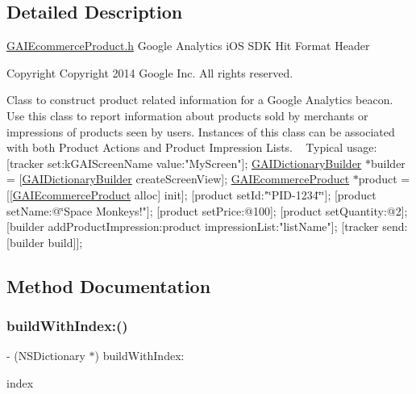 \subsection{Detailed Description}
\hyperlink{_g_a_i_ecommerce_product_8h}{G\+A\+I\+Ecommerce\+Product.\+h}  Google Analytics i\+OS S\+DK Hit Format Header \begin{DoxyCopyright}{Copyright}
Copyright 2014 Google Inc. All rights reserved.
\end{DoxyCopyright}
Class to construct product related information for a Google Analytics beacon. Use this class to report information about products sold by merchants or impressions of products seen by users. Instances of this class can be associated with both Product Actions and Product Impression Lists. ~\newline
 Typical usage\+: {\ttfamily  \mbox{[}tracker set\+:k\+G\+A\+I\+Screen\+Name value\+:"My\+Screen"\mbox{]}; \hyperlink{interface_g_a_i_dictionary_builder}{G\+A\+I\+Dictionary\+Builder} $\ast$builder = \mbox{[}\hyperlink{interface_g_a_i_dictionary_builder}{G\+A\+I\+Dictionary\+Builder} create\+Screen\+View\mbox{]}; \hyperlink{interface_g_a_i_ecommerce_product}{G\+A\+I\+Ecommerce\+Product} $\ast$product = \mbox{[}\mbox{[}\hyperlink{interface_g_a_i_ecommerce_product}{G\+A\+I\+Ecommerce\+Product} alloc\mbox{]} init\mbox{]}; \mbox{[}product set\+Id\+:"\char`\"{}\+P\+I\+D-\/1234\char`\"{}\char`\"{}\mbox{]};
\mbox{[}product set\+Name\+:@\char`\"{}Space Monkeys!"\mbox{]}; \mbox{[}product set\+Price\+:@100\mbox{]}; \mbox{[}product set\+Quantity\+:@2\mbox{]}; \mbox{[}builder add\+Product\+Impression\+:product impression\+List\+:"list\+Name"\mbox{]}; \mbox{[}tracker send\+:\mbox{[}builder build\mbox{]}\mbox{]}; } 

\subsection{Method Documentation}
\mbox{\label{interface_g_a_i_ecommerce_product_a3ff6808550d4b30b9d83e862fc32f1ad}} 
\subsubsection{\texorpdfstring{build\+With\+Index\+:()}{buildWithIndex:()}}
{\footnotesize\ttfamily -\/ (N\+S\+Dictionary $\ast$) build\+With\+Index\+: \begin{DoxyParamCaption}\item[{(N\+S\+U\+Integer)}]{index }\end{DoxyParamCaption}}


